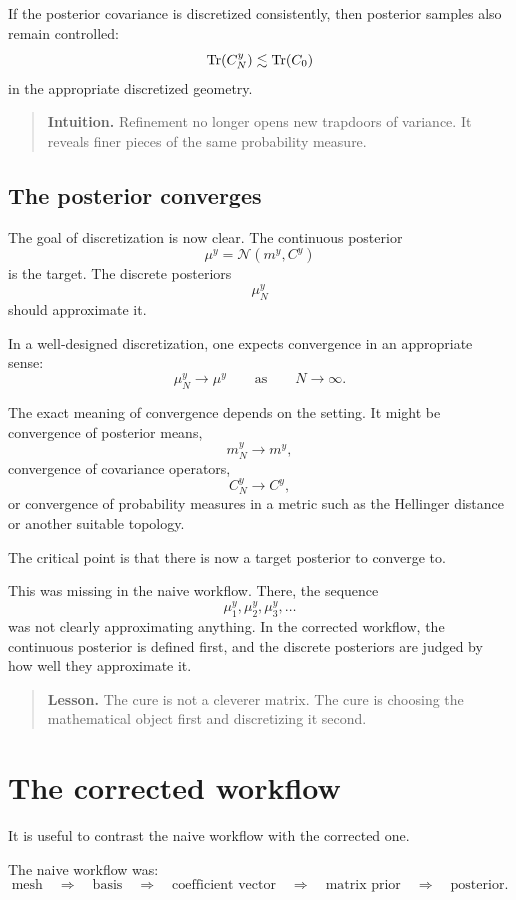 \documentclass[11pt,a4paper]{book}
\newenvironment{intuition}
  {\begin{quote}\textbf{Intuition.}}
  {\end{quote}}
\newenvironment{lesson}
  {\begin{quote}\textbf{Lesson.}}
  {\end{quote}}
\newcommand{\post}{\mu^y}
\begin{document}
If the posterior covariance is discretized consistently, then posterior samples
also remain controlled:
\[
    \Tr(C_N^y)
    \lesssim
    \Tr(C_0)
\]
in the appropriate discretized geometry.

\begin{intuition}
Refinement no longer opens new trapdoors of variance. It reveals finer pieces
of the same probability measure.
\end{intuition}

\subsection{The posterior converges}

The goal of discretization is now clear. The continuous posterior
\[
    \post=\mathcal{N}(m^y,C^y)
\]
is the target. The discrete posteriors
\[
    \post_N
\]
should approximate it.

In a well-designed discretization, one expects convergence in an appropriate
sense:
\[
    \post_N \to \post
    \qquad
    \text{as}
    \qquad
    N\to\infty.
\]

The exact meaning of convergence depends on the setting. It might be convergence
of posterior means,
\[
    m_N^y\to m^y,
\]
convergence of covariance operators,
\[
    C_N^y\to C^y,
\]
or convergence of probability measures in a metric such as the Hellinger
distance or another suitable topology.

The critical point is that there is now a target posterior to converge to.

This was missing in the naive workflow. There, the sequence
\[
    \post_1,\post_2,\post_3,\ldots
\]
was not clearly approximating anything. In the corrected workflow, the
continuous posterior is defined first, and the discrete posteriors are judged by
how well they approximate it.

\begin{lesson}
The cure is not a cleverer matrix.
The cure is choosing the mathematical object first and discretizing it second.
\end{lesson}

\section{The corrected workflow}

It is useful to contrast the naive workflow with the corrected one.

The naive workflow was:
\[
    \text{mesh}
    \quad\Rightarrow\quad
    \text{basis}
    \quad\Rightarrow\quad
    \text{coefficient vector}
    \quad\Rightarrow\quad
    \text{matrix prior}
    \quad\Rightarrow\quad
    \text{posterior}.
\]
\end{document}
